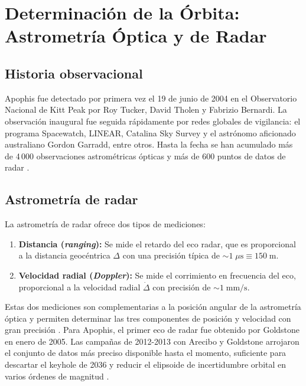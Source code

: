 \documentclass[a4paper]{article}
\begin{document}
\section{Determinación de la Órbita: Astrometría Óptica y de Radar}

\subsection{Historia observacional}

Apophis fue detectado por primera vez el 19 de junio de 2004 en el Observatorio Nacional de Kitt Peak por Roy Tucker, David Tholen y Fabrizio Bernardi. La observación inaugural fue seguida rápidamente por redes globales de vigilancia: el programa Spacewatch, LINEAR, Catalina Sky Survey y el astrónomo aficionado australiano Gordon Garradd, entre otros. Hasta la fecha se han acumulado más de 4\,000 observaciones astrométricas ópticas y más de 600 puntos de datos de radar \cite{jpl2024sbdb, brozovic2018radar}.

\subsection{Astrometría de radar}

La astrometría de radar ofrece dos tipos de mediciones:
\begin{enumerate}
  \item \textbf{Distancia (\textit{ranging}):} Se mide el retardo del eco radar, que es proporcional a la distancia geocéntrica $\Delta$ con una precisión típica de $\sim 1\;\mu\text{s} \equiv 150\;\text{m}$.
  \item \textbf{Velocidad radial (\textit{Doppler}):} Se mide el corrimiento en frecuencia del eco, proporcional a la velocidad radial $\dot\Delta$ con precisión de $\sim 1\;\text{mm/s}$.
\end{enumerate}

Estas dos mediciones son complementarias a la posición angular de la astrometría óptica y permiten determinar las tres componentes de posición y velocidad con gran precisión \cite{naidu2022radar, brozovic2018radar}. Para Apophis, el primer eco de radar fue obtenido por Goldstone en enero de 2005. Las campañas de 2012-2013 con Arecibo y Goldstone arrojaron el conjunto de datos más preciso disponible hasta el momento, suficiente para descartar el keyhole de 2036 y reducir el elipsoide de incertidumbre orbital en varios órdenes de magnitud \cite{brozovic2018radar, farnocchia2013yarkovsky}.
\end{document}
